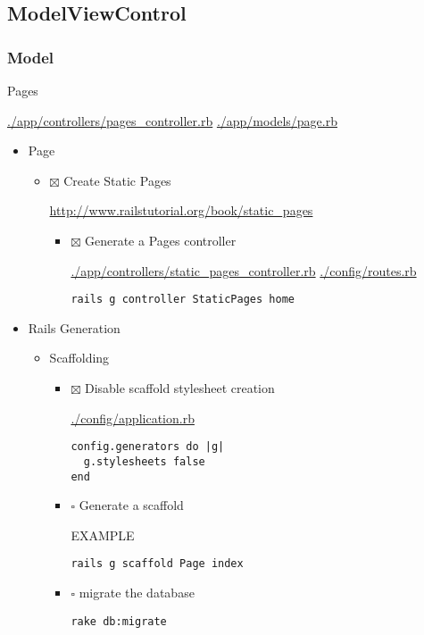 \documentclass[11pt]{article}
\begin{document}
\subsection*{ModelViewControl}
\label{sec-1-3}

\subsubsection*{Model}
\label{sec-1-3-1}

Pages

\url{./app/controllers/pages_controller.rb}
\url{./app/models/page.rb}

\begin{itemize}
\item Page
\label{sec-1-3-1-1}

\begin{itemize}
\item $\boxtimes$ Create Static Pages

\url{http://www.railstutorial.org/book/static_pages}

\begin{itemize}
\item $\boxtimes$ Generate a Pages controller

\url{./app/controllers/static_pages_controller.rb}
\url{./config/routes.rb}

\begin{verbatim}
rails g controller StaticPages home
\end{verbatim}
\end{itemize}
\end{itemize}

\item Rails Generation
\label{sec-1-3-1-2}

\begin{itemize}
\item Scaffolding
\label{sec-1-3-1-2-1}

\begin{itemize}
\item $\boxtimes$ Disable scaffold stylesheet creation 

\url{./config/application.rb}

\begin{verbatim}
config.generators do |g|
  g.stylesheets false
end
\end{verbatim}

\item $\square$ Generate a scaffold

EXAMPLE
\begin{verbatim}
rails g scaffold Page index
\end{verbatim}

\item $\square$ migrate the database

\begin{verbatim}
rake db:migrate
\end{verbatim}
\end{itemize}
\end{itemize}
\end{itemize}
\end{document}
